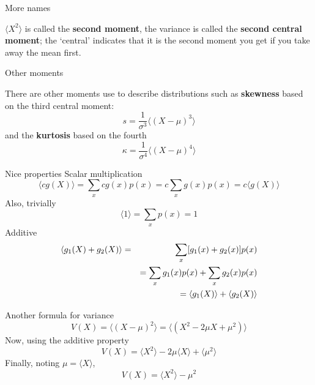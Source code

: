 \documentclass{beamer}
\newcommand{\crish}{\color{reddish}}
\newcommand{\cbla}{\color{black}}
\begin{document}
\begin{frame}{More names}

\crish$\langle X^2\rangle$\cbla{}  is called the \textbf{second
  moment}, the variance is called the \textbf{second central moment};
the \lq{}central\rq{} indicates that it is the second moment you get
if you take away the mean first.

\end{frame}

\begin{frame}{Other moments}

There are other moments use to describe distributions such as \textbf{skewness} based on the third central moment:
\crish$$
s=\frac{1}{\sigma^3}\langle(X-\mu)^3\rangle
$$\cbla{}
and the \textbf{kurtosis} based on the fourth
\crish$$
\kappa=\frac{1}{\sigma^4}\langle(X-\mu)^4\rangle
$$\cbla{}
\end{frame}


\begin{frame}{Nice properties}
  Scalar multiplication
\crish$$
    \langle c g(X)\rangle =\sum_x cg(x)p(x)=c\sum_x g(x)p(x)=c\langle g(X)\rangle
$$\cbla{}
Also, trivially
\crish$$
\langle 1\rangle=\sum_x p(x)=1
$$\cbla{}
Additive
\crish
\begin{eqnarray*}
\langle g_1(X)+g_2(X)\rangle &=&\sum_x [g_1(x)+g_2(x)]p(x)\cr
&&=\sum_x g_1(x)p(x)+\sum_x g_2(x)p(x)\cr
&&=\langle g_1(X)\rangle+\langle g_2(X)\rangle
\end{eqnarray*}
\cbla{} 
\end{frame}

\begin{frame}{Another formula for variance}
\crish$$
V(X)=\langle (X-\mu)^2\rangle=\langle (X^2-2\mu X+\mu^2)\rangle
$$\cbla{}
Now, using the additive property
\crish$$
V(X)=\langle X^2 \rangle -2\mu\langle X\rangle +\langle \mu^2 \rangle
$$\cbla{}
Finally, noting \crish$\mu=\langle X\rangle$\cbla{},
\crish$$
V(X)=\langle X^2 \rangle - \mu^2 
$$\cbla{}

\end{frame}
\end{document}
